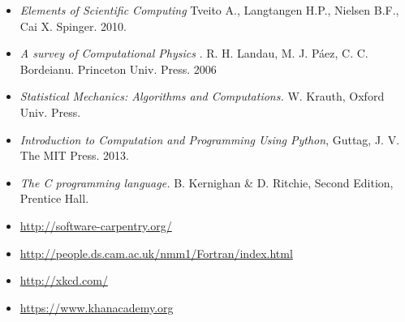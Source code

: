 \documentclass[11pt]{article}
\begin{document}
\begin{itemize}
\item
\textit{Elements of Scientific Computing}
Tveito A., Langtangen H.P., Nielsen B.F., Cai X. Spinger. 2010.
\item
\textit{A survey of Computational Physics}
. R. H. Landau, M. J. P\'aez, C. C. Bordeianu. Princeton Univ. Press. 2006
\item 
\textit{Statistical Mechanics: Algorithms and Computations.}
W. Krauth, Oxford Univ. Press. 
\item 
\textit{Introduction to Computation and Programming Using Python},
Guttag, J. V. The MIT Press. 2013.
\item 
\textit{The C programming language.}
 B. Kernighan \& D. Ritchie, Second Edition, Prentice Hall.
\item\url{http://software-carpentry.org/}
\item\url{http://people.ds.cam.ac.uk/nmm1/Fortran/index.html}
\item\url{http://xkcd.com/}
\item\url{https://www.khanacademy.org}
\end{itemize}

 
\end{document}
